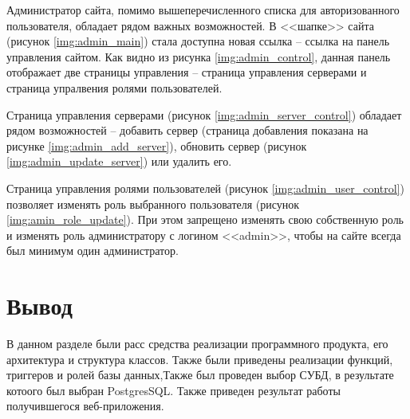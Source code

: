 Администратор сайта, помимо вышеперечисленного списка для авторизованного пользователя, обладает рядом важных возможностей. В <<шапке>> сайта (рисунок \ref{img:admin_main}) стала доступна новая ссылка -- ссылка на панель управления сайтом. Как видно из рисунка \ref{img:admin_control}, данная панель отображает две страницы управления -- страница управления серверами и страница упралвения ролями пользователей.

Страница управления серверами (рисунок \ref{img:admin_server_control}) обладает рядом возможностей -- добавить сервер (страница добавления показана на рисунке \ref{img:admin_add_server}), обновить сервер (рисунок \ref{img:admin_update_server}) или удалить его.

Страница управления ролями пользователей (рисунок \ref{img:admin_user_control}) позволяет изменять роль выбранного пользователя (рисунок \ref{img:amin_role_update}). При этом запрещено изменять свою собственную роль и изменять роль администратору с логином <<admin>>, чтобы на сайте всегда был минимум один администратор.



\clearpage
{}


\section*{Вывод}

В данном разделе были расс средства реализации программного продукта, его архитектура и структура классов. Также были приведены реализации функций, триггеров и ролей базы данных,Также был проведен выбор СУБД, в результате котоого был выбран PostgresSQL. Также приведен результат работы получившегося веб-приложения. 
